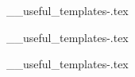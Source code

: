 \begin{filecontents*}{__useful_templates-\theusefultemplate.tex}
\end{filecontents*}


\begin{filecontents*}{__useful_templates-\theusefultemplate.tex}
\end{filecontents*}

\begin{filecontents*}{__useful_templates-\theusefultemplate.tex}
\end{filecontents*}

